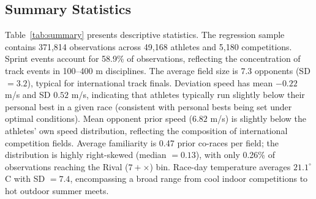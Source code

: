 \documentclass[12pt]{article}
\theoremstyle{definition}
\theoremstyle{remark}
\begin{document}
\subsection{Summary Statistics}

Table~\ref{tab:summary} presents descriptive statistics.
The regression sample contains 371{,}814 observations across 49{,}168 athletes
and 5{,}180 competitions.
Sprint events account for 58.9\% of observations, reflecting the concentration
of track events in 100--400 m disciplines.
The average field size is 7.3 opponents (SD $= 3.2$), typical for international
track finals.
Deviation speed has mean $-0.22$ m/s and SD $0.52$ m/s, indicating that
athletes typically run slightly below their personal best in a given race
(consistent with personal bests being set under optimal conditions).
Mean opponent prior speed ($6.82$ m/s) is slightly below the athletes' own
speed distribution, reflecting the composition of international competition
fields.
Average familiarity is 0.47 prior co-races per field; the distribution is
highly right-skewed (median $= 0.13$), with only 0.26\% of observations
reaching the Rival ($7+\times$) bin.
Race-day temperature averages $21.1^\circ$C with SD $= 7.4$, encompassing
a broad range from cool indoor competitions to hot outdoor summer meets.
\end{document}
